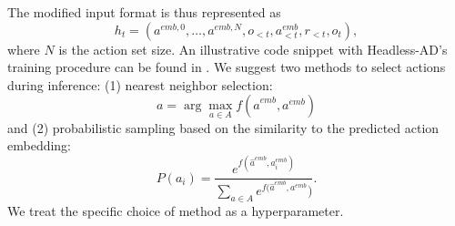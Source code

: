 The modified input format is thus represented as
\[
h_t = \left(a^{emb,0}, \dots, a^{emb,N}, o_{<t}, a^{emb}_{<t}, r_{<t}, o_t\right),
\]
where $N$ is the action set size. An illustrative code snippet with Headless-AD's training procedure can be found in .
\newline
\newline
We suggest two methods to select actions during inference: (1) nearest neighbor selection:
\[
a = \arg \max_{a \in A} f(\hat{a}^{emb}, a^{emb})
\]
and (2) probabilistic sampling based on the similarity to the predicted action embedding:
\[
P(a_i) = \frac{e^{f(\hat{a}^{emb}, a^{emb}_i)}}{\sum_{a \in A}{e^{f(\hat{a}^{emb}, a^{emb}}})}.
\]
We treat the specific choice of method as a hyperparameter.